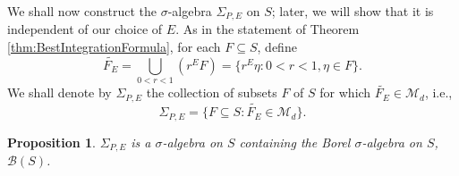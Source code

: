 \documentclass[11pt]{article}
\newtheorem{proposition}[theorem]{Proposition}
\theoremstyle{remark}
\begin{document}
\noindent We shall now construct the $\sigma$-algebra $\Sigma_{P,E}$ on $S$; later, we will show that it is independent of our choice of $E$. As in the statement of Theorem \ref{thm:BestIntegrationFormula}, for each $F\subseteq S$, define
\begin{equation*}
\widetilde{F_E}=\bigcup_{0<r<1}\left(r^E F\right)=\{r^E\eta:0<r<1,\eta\in F\}. 
\end{equation*}
We shall denote by $\Sigma_{P,E}$ the collection of subsets $F$ of $S$ for which $\widetilde{F_E}\in\mathcal{M}_d$, i.e.,  
\begin{equation*}
\Sigma_{P,E}=\{F\subseteq S:\widetilde{F_E}\in\mathcal{M}_d\}.
\end{equation*}


\begin{proposition}\label{prop:BorelContainment}
$\Sigma_{P,E}$ is a $\sigma$-algebra on $S$ containing the Borel $\sigma$-algebra on $S$, $\mathcal{B}(S)$.
\end{proposition}
\end{document}
